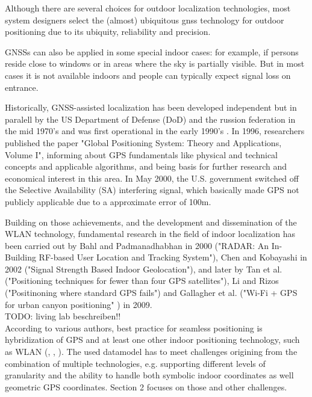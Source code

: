
Although there are several choices for outdoor localization technologies, most system designers select the (almost) ubiquitous \ac{gnss} technology for outdoor positioning due to its ubiquity, reliability and precision. 

GNSSs can also be applied in some special indoor cases:
for example, if persons reside close to windows or in areas where the sky is partially visible. But in most cases it is not available indoors and people can typically expect signal loss on entrance.

Historically, GNSS-assisted localization has been developed independent but in paralell by the US Department of Defense (DoD) and the russion federation in the mid 1970's and was first operational in the early 1990's . %
In 1996, researchers published the paper "Global Positioning System: Theory and Applications, Volume I", informing about GPS fundamentals like physical and technical concepts and applicable algorithms, and being basis for further research and economical interest in this area. In May 2000, the U.S. government switched off the Selective Availability (SA) interfering signal, which basically made GPS not publicly applicable due to a approximate error of 100m.

Building on those achievements, and the development and dissemination of the WLAN technology, fundamental research in the field of indoor localization has been carried out by Bahl and Padmanadhabhan in 2000 ("RADAR: An In-Building RF-based User Location and Tracking System"), Chen and Kobayashi in 2002 ("Signal Strength Based Indoor Geolocation"), and later by Tan et al. ("Positioning techniques for fewer than four GPS satellites"), Li and Rizos ("Positinoning where standard GPS fails") and Gallagher et al. ("Wi-Fi + GPS for urban canyon positioning" \cite{wifiGPSUrbanCanyon}) in 2009.\\

 TODO: living lab beschreiben!!\\
 
According to various authors, best practice for seamless positioning is hybridization of GPS and at least one other indoor positioning technology, such as WLAN (\cite{wifiGPSUrbanCanyon}, \cite{streamspin}, \cite{zeroConfigGPSWLAN}). The used datamodel has to meet challenges origining from the combination of multiple technologies, e.g. supporting different levels of granularity and the ability to handle both symbolic indoor coordinates as well geometric GPS coordinates.
Section 2 focuses on those and other challenges.

